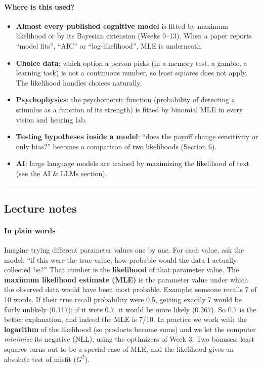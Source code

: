 \paragraph{Where is this used?}

\begin{itemize}
\tightlist
\item
  \textbf{Almost every published cognitive model} is fitted by maximum
  likelihood or by its Bayesian extension (Weeks 9--13). When a paper
  reports ``model fits'', ``AIC'' or ``log-likelihood'', MLE is
  underneath.
\item
  \textbf{Choice data}: which option a person picks (in a memory test, a
  gamble, a learning task) is not a continuous number, so least squares
  does not apply. The likelihood handles choices naturally.
\item
  \textbf{Psychophysics}: the psychometric function (probability of
  detecting a stimulus as a function of its strength) is fitted by
  binomial MLE in every vision and hearing lab.
\item
  \textbf{Testing hypotheses inside a model}: ``does the payoff change
  sensitivity or only bias?'' becomes a comparison of two likelihoods
  (Section 6).
\item
  \textbf{AI}: large language models are trained by maximizing the
  likelihood of text (see the AI \& LLMs section).
\end{itemize}

\begin{center}\rule{0.5\linewidth}{0.5pt}\end{center}


\subsection{Lecture notes}

\paragraph{In plain words}

Imagine trying different parameter values one by one. For each value,
ask the model: ``if this were the true value, how probable would the
data I actually collected be?'' That number is the \textbf{likelihood}
of that parameter value. The \textbf{maximum likelihood estimate (MLE)}
is the parameter value under which the observed data would have been
most probable. Example: someone recalls 7 of 10 words. If their true
recall probability were 0.5, getting exactly 7 would be fairly unlikely
(0.117); if it were 0.7, it would be more likely (0.267). So 0.7 is the
better explanation, and indeed the MLE is 7/10. In practice we work with
the \textbf{logarithm} of the likelihood (so products become sums) and
we let the computer \emph{minimize} its negative (NLL), using the
optimizers of Week 3. Two bonuses: least squares turns out to be a
special case of MLE, and the likelihood gives an absolute test of misfit
(\(G^2\)).

